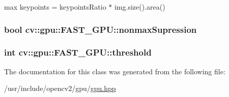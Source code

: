 max keypoints = keypoints\-Ratio $\ast$ img.\-size().area() 

\hypertarget{classcv_1_1gpu_1_1FAST__GPU_a73b328bc50cd60cec18f85bea59dff1c}{
\subsubsection[{nonmax\-Supression}]{\setlength{\rightskip}{0pt plus 5cm}bool cv\-::gpu\-::\-F\-A\-S\-T\-\_\-\-G\-P\-U\-::nonmax\-Supression}}\label{classcv_1_1gpu_1_1FAST__GPU_a73b328bc50cd60cec18f85bea59dff1c}
\hypertarget{classcv_1_1gpu_1_1FAST__GPU_a28b49bef52f11f2c366bf9167c52d985}{
\subsubsection[{threshold}]{\setlength{\rightskip}{0pt plus 5cm}int cv\-::gpu\-::\-F\-A\-S\-T\-\_\-\-G\-P\-U\-::threshold}}\label{classcv_1_1gpu_1_1FAST__GPU_a28b49bef52f11f2c366bf9167c52d985}


The documentation for this class was generated from the following file\-:\begin{DoxyCompactItemize}
\item 
/usr/include/opencv2/gpu/\hyperlink{gpu_2gpu_8hpp}{gpu.\-hpp}\end{DoxyCompactItemize}
